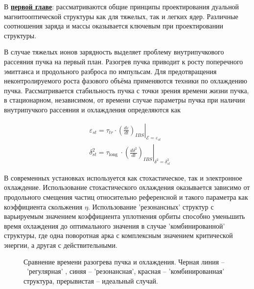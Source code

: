 В \underline{\textbf{первой главе}}: рассматриваются общие принципы проектирования дуальной магнитооптической структуры как для тяжелых, так и легких ядер. Различные соотношения заряда и массы оказывается ключевым при проектировании структуры. 
\par В случае тяжелых ионов зарядность выделяет проблему внутрипучкового рассеяния пучка на первый план. Разогрев пучка приводит к росту поперечного эмиттанса и продольного разброса по импульсам. Для предотвращения неконтролируемого роста фазового объёма применяются техники по охлаждению пучка. Рассматривается стабильность пучка с точки зрения времени жизни пучка, в стационарном, независимом, от времени случае параметры пучка при наличии внутрипучкого рассеяния и охлаждления определяются как

\[
    \begin{aligned}
& \varepsilon_{s t}=\left.\tau_{t r} \cdot\left(\frac{d \varepsilon}{d t}\right)_{I B S}\right|_{\mathcal{E}=\varepsilon_{s t}} \\
& \delta_{s t}^2=\left.\tau_{\text {long }} \cdot\left(\frac{d \delta^2}{d t}\right)_{I B S}\right|_{\delta^2=\delta_{s t}^2}
\end{aligned}
\]

\noindent В современных установках используется как стохастическое, так и электронное охлаждение. Использование стохастического охлаждения оказывается зависимо от продольного смещения частиц относительно референсной и такого параметра как коэффициента скольжения $\eta$. Использование 'резонансных' структур с варьируемым значением коэффициента уплотнения орбиты способно уменьшить время охлаждения до оптимального значения в случае 'комбинированной' структуры, где одна поворотная арка с комплексным значением критической энергии, а другая с действительными.

\begin{figure}[ht]
    \caption{Сравнение времени разогрева пучка и охлаждения. Черная линия – 'регулярная' , синяя – 'резонансная', красная – 'комбинированная' структура, прерывистая – идеальный случай.}\label{fig:latex}
\end{figure}


